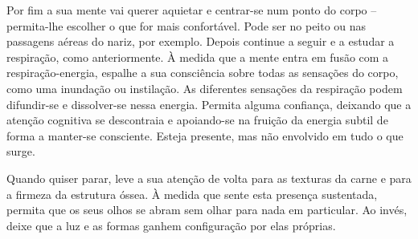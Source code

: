 \enlargethispage{\baselineskip}

Por fim a sua mente vai querer aquietar e centrar-se num ponto do corpo --
permita-lhe escolher o que for mais confortável. Pode ser no peito ou nas
passagens aéreas do nariz, por exemplo. Depois continue a seguir e a estudar a
respiração, como anteriormente. À medida que a mente entra em fusão com a
respiração-energia, espalhe a sua consciência sobre todas as sensações do corpo,
como uma inundação ou instilação. As diferentes sensações da respiração podem
difundir-se e dissolver-se nessa energia. Permita alguma confiança, deixando que
a atenção cognitiva se descontraia e apoiando-se na fruição da energia subtil de
forma a manter-se consciente. Esteja presente, mas não envolvido em tudo o que
surge.

Quando quiser parar, leve a sua atenção de volta para as texturas da carne e
para a firmeza da estrutura óssea. À medida que sente esta presença sustentada,
permita que os seus olhos se abram sem olhar para nada em particular. Ao invés,
deixe que a luz e as formas ganhem configuração por elas próprias.
